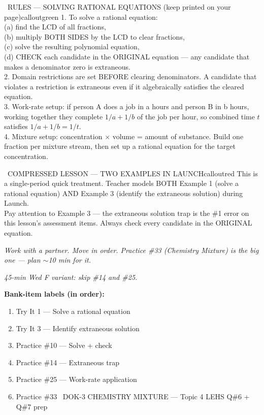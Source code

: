 \documentclass[11pt]{article}
\begin{document}
\begin{callout}{\IconBook\ RULES --- SOLVING RATIONAL EQUATIONS (keep printed on your page)}{calloutgreen}
1. To solve a rational equation:\\
\hspace*{1.6em}(a) find the LCD of all fractions,\\
\hspace*{1.6em}(b) multiply BOTH SIDES by the LCD to clear fractions,\\
\hspace*{1.6em}(c) solve the resulting polynomial equation,\\
\hspace*{1.6em}(d) CHECK each candidate in the ORIGINAL equation --- any candidate that makes a denominator zero is extraneous.\\
2. Domain restrictions are set BEFORE clearing denominators. A candidate that violates a restriction is extraneous even if it algebraically satisfies the cleared equation.\\
3. Work-rate setup: if person A does a job in a hours and person B in b hours, working together they complete \(1/a + 1/b\) of the job per hour, so combined time \(t\) satisfies \(1/a + 1/b = 1/t\).\\
4. Mixture setup: concentration \(\times\) volume = amount of substance. Build one fraction per mixture stream, then set up a rational equation for the target concentration.
\end{callout}

\begin{callout}{\IconWarn\ COMPRESSED LESSON --- TWO EXAMPLES IN LAUNCH}{calloutred}
This is a single-period quick treatment. Teacher models BOTH Example 1 (solve a rational equation) AND Example 3 (identify the extraneous solution) during Launch.\\
Pay attention to Example 3 --- the extraneous solution trap is the \#1 error on this lesson's assessment items. Always check every candidate in the ORIGINAL equation.
\end{callout}

\textit{Work with a partner. Move in order. Practice \#33 (Chemistry Mixture) is the big one --- plan \(\sim\)10 min for it.}

\textit{45-min Wed F variant: skip \#14 and \#25.}

\textbf{Bank-item labels (in order):}
\begin{enumerate}[leftmargin=1.6em,itemsep=2pt,topsep=2pt]
  \item Try It 1 --- Solve a rational equation
  \item Try It 3 --- Identify extraneous solution
  \item Practice \#10 --- Solve + check
  \item Practice \#14 --- Extraneous trap
  \item Practice \#25 --- Work-rate application
  \item Practice \#33 \IconStar\ DOK-3 CHEMISTRY MIXTURE --- Topic 4 LEHS Q\#6 + Q\#7 prep
\end{enumerate}
\end{document}
